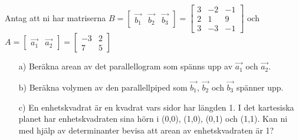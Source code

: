 Antag att ni har matriserna $B=\begin{bmatrix} \vec{b_1} & \vec{b_2} & \vec{b_3} \end{bmatrix} = \begin{bmatrix}3 & -2 & -1\\ 2 & 1 & 9 \\ 3 & -3 & -1\end{bmatrix}$ och $A = \begin{bmatrix} \vec{a_1} & \vec{a_2}\end{bmatrix} =\begin{bmatrix} -3 & 2 \\ 7 & 5\end{bmatrix}$
\begin{itemize}
	\item[a) ] Beräkna arean av det parallellogram som spänns upp av $\vec{a_1}$ och $\vec{a_2}$.
	\item[b) ] Beräkna volymen av den parallellpiped som $\vec{b_1}$, $\vec{b_2}$ och $\vec{b_3}$ spänner upp.
	\item[c) ] En enhetskvadrat är en kvadrat vars sidor har längden 1. I det kartesiska planet har enhetskvadraten sina hörn i (0,0), (1,0), (0,1) och (1,1). Kan ni med hjälp av determinanter bevisa att arean av enhetskvadraten är 1? 
\end{itemize}
